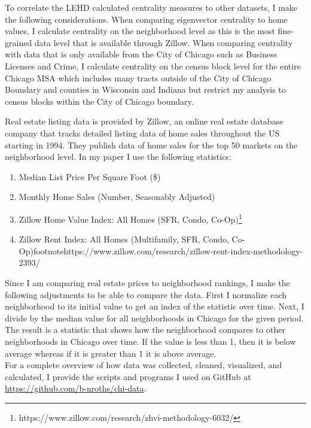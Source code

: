 \documentclass{article}
\theoremstyle{definition}
\theoremstyle{remark}
\begin{document}
To correlate the LEHD calculated centrality measures to other datasets, I make the following considerations.  When comparing eigenvector centrality to home values, I calculate centrality on the neighborhood level as this is the most fine-grained data level that is available through Zillow.  When comparing centrality with data that is only available from the City of Chicago such as Business Licenses and Crime, I calculate centrality on the census block level for the entire Chicago MSA which includes many tracts outside of the City of Chicago Boundary and counties in Wisconsin and Indiana but restrict my analysis to census blocks within the City of Chicago boundary.

Real estate listing data is provided by Zillow, an online real estate database company that tracks detailed listing data of home sales throughout the US starting in 1994.  They publish data of home sales for the top 50 markets on the neighborhood level.  In my paper I use the following statistics:
\begin{enumerate}
\item Median List Price Per Square Foot (\$)
\item Monthly Home Sales (Number, Seasonably Adjusted)
\item Zillow Home Value Index: All Homes (SFR, Condo, Co-Op)\footnote{https://www.zillow.com/research/zhvi-methodology-6032/}
\item Zillow Rent Index: All Homes (Multifamily, SFR, Condo, Co-Op)footnote{https://www.zillow.com/research/zillow-rent-index-methodology-2393/}
\end{enumerate}
Since I am comparing real estate prices to neighborhood rankings, I make the following adjustments to be able to compare the data.  First I normalize each neighborhood to its initial value to get an index of the statistic over time.  Next, I divide by the median value for all neighborhoods in Chicago for the given period.  The result is a statistic that shows how the neighborhood compares to other neighborhoods in Chicago over time.  If the value is less than 1, then it is below average whereas if it is greater than 1 it is above average. \\
For a complete overview of how data was collected, cleaned, visualized, and calculated, I provide the scripts and programs I used on GitHub at \url{https://github.com/b-nroths/chi-data}. 
\end{document}
